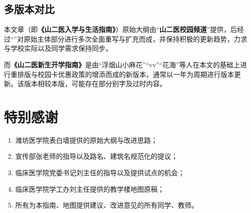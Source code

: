 \subsection[多版本对比]{多版本对比}
本文章（即\textbf{《山二医入学与生活指南》}）原始大纲由“\textbf{山二医校园频道}”提供，后经过“\textbf{}”对原始主体部分进行多次全面重写与扩充而成，并保持积极的更新趋势，力求与学校实际以及同学需求保持同步。

而\textbf{《山二医新生开学指南》}是由“浮烟山小麻花”“vv”“花海”等人在本文的基础上进行重排版与校园卡优惠政策的增添而成的新版本，通常以一年为周期进行版本更新。该版本相较本版，可能存在部分别字及过时内容。

\textbf{}

\section[特别感谢]{特别感谢}

\begin{enumerate}
    \item 潍坊医学院表白墙提供的原始大纲与改进思路；
    \item 宣传部张老师的指导以及路名、建筑名规范化的提议；
    \item 临床医学院党委书记刘主任的指导以及提供试点的机会；
    \item 临床医学院学工办刘主任提供的教学楼地图原稿；
    \item 所有为本指南、地图提供建议、改进意见的所有同学、教师。
\end{enumerate}
